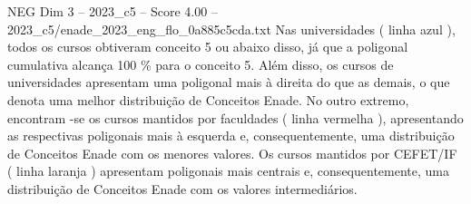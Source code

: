 \begin{textsample}{NEG Dim 3 – 2023\_c5 – Score 4.00 – 2023\_c5/enade\_2023\_eng\_flo\_0a885c5cda.txt}
Nas universidades ( linha azul ), todos os cursos obtiveram conceito 5 ou abaixo disso, já que a poligonal cumulativa alcança 100 \% para o conceito 5.
Além disso, os cursos de universidades apresentam uma poligonal mais à direita do que as demais, o que denota uma melhor distribuição de Conceitos Enade.
No outro extremo, encontram -se os cursos mantidos por faculdades ( linha vermelha ), apresentando as respectivas poligonais mais à esquerda e, consequentemente, uma distribuição de Conceitos Enade com os menores valores.
Os cursos mantidos por CEFET/IF ( linha laranja ) apresentam poligonais mais centrais e, consequentemente, uma distribuição de Conceitos Enade com os valores intermediários.

\end{textsample}
